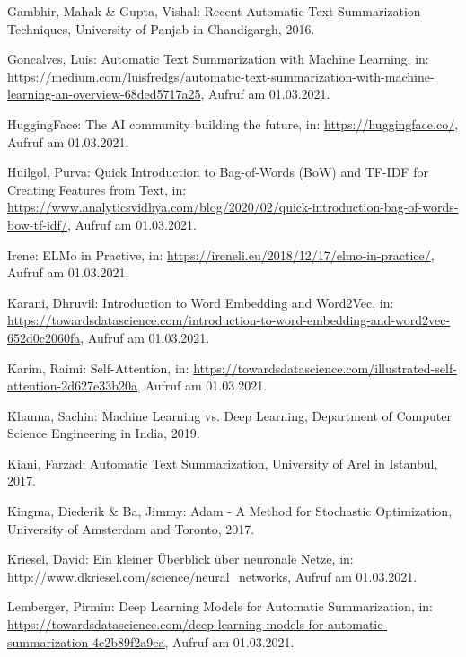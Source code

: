 \begin{thebibliography}{50}
Gambhir, Mahak \& Gupta, Vishal: Recent Automatic Text Summarization Techniques, University of Panjab in Chandigargh, 2016.

Goncalves, Luis: Automatic Text Summarization with Machine Learning, in: \url{https://medium.com/luisfredgs/automatic-text-summarization-with-machine-learning-an-overview-68ded5717a25}, Aufruf am 01.03.2021.

HuggingFace: The AI community building the future, in: \url{https://huggingface.co/}, Aufruf am 01.03.2021.

Huilgol, Purva: Quick Introduction to Bag-of-Words (BoW) and TF-IDF for Creating Features from Text, in: \url{https://www.analyticsvidhya.com/blog/2020/02/quick-introduction-bag-of-words-bow-tf-idf/}, Aufruf am 01.03.2021.

Irene: ELMo in Practive, in: \url{https://ireneli.eu/2018/12/17/elmo-in-practice/}, Aufruf am 01.03.2021.

Karani, Dhruvil: Introduction to Word Embedding and Word2Vec, in: \url{https://towardsdatascience.com/introduction-to-word-embedding-and-word2vec-652d0c2060fa}, Aufruf am 01.03.2021.

Karim, Raimi: Self-Attention, in: \url{https://towardsdatascience.com/illustrated-self-attention-2d627e33b20a}, Aufruf am 01.03.2021.

Khanna, Sachin: Machine Learning vs. Deep Learning, Department of Computer Science Engineering in India, 2019.

Kiani, Farzad: Automatic Text Summarization, University of Arel in Istanbul, 2017.

Kingma, Diederik \& Ba, Jimmy: Adam - A Method for Stochastic Optimization, University of Amsterdam and Toronto, 2017.

Kriesel, David: Ein kleiner Überblick über neuronale Netze, in: \url{http://www.dkriesel.com/science/neural_networks}, Aufruf am 01.03.2021.

Lemberger, Pirmin: Deep Learning Models for Automatic Summarization, in: \url{https://towardsdatascience.com/deep-learning-models-for-automatic-summarization-4c2b89f2a9ea}, Aufruf am 01.03.2021.


\end{thebibliography}
